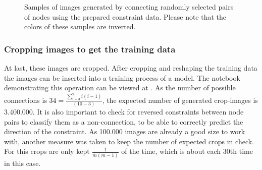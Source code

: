 \begin{figure}
\begin{subfigure}[b]{0.19\textwidth}
    \end{subfigure}
    \begin{subfigure}[b]{0.19\textwidth}
    \end{subfigure}
    \caption[Randomly connected nodes using constraint data]{Samples of images generated by connecting randomly selected pairs of nodes using the prepared constraint data. Please note that the colors of these samples are inverted.}\label{fig:constraint_data_step2}
\end{figure}

\subsubsection{Cropping images to get the training data}\label{ch:cropping_images}

At last, these images are cropped.
After cropping and reshaping the training data the images can be inserted into a training process of a  model.
The notebook demonstrating this operation can be viewed at .
As the number of possible connections is \(34 = \frac{\sum_{i=3}^{9}i(i-1)}{(10-3)}\), the expected number of generated crop-images is 3.400.000.
It is also important to check for reversed constraints between node pairs to classify them as a non-connection, to be able to correctly predict the direction of the constraint.
As 100.000 images are already a good size to work with, another measure was taken to keep the number of expected crops in check.
For this crops are only kept \(\frac{1}{m(m-1)}\) of the time, which is about each 30th time in this case.

